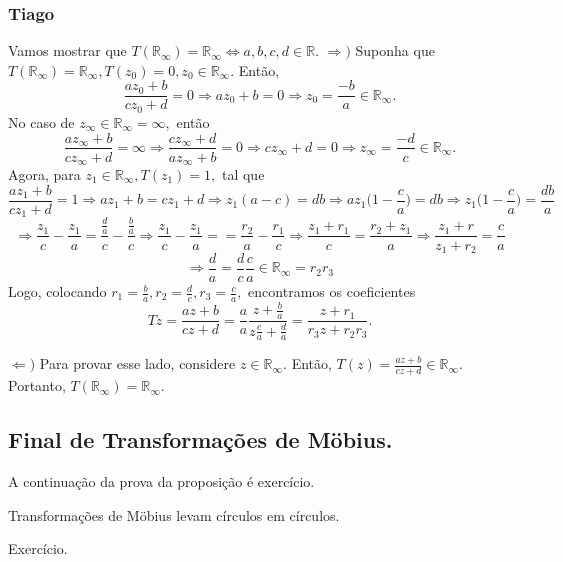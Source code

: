 \documentclass[ComplexAnalysis/complex.tex]{subfiles}
\begin{document}
\subsubsection{Tiago}
Vamos mostrar que $T(\mathbb{R}_\infty) = \mathbb{R}_{\infty}\Longleftrightarrow a, b, c, d\in \mathbb{R}$.
$\Rightarrow)$ Suponha que $T(\mathbb{R}_\infty) = \mathbb{R}_\infty, T(z_{0}) = 0, z_{0}\in \mathbb{R}_\infty.$ Então,
$$
	\frac{az_{0} + b}{cz_{0} + d} = 0\Rightarrow az_{0} + b = 0\Rightarrow z_{0} = \frac{-b}{a}\in \mathbb{R}_\infty.
$$
No caso de $z_\infty \in \mathbb{R}_\infty = \infty, $ então
$$
	\frac{az_{\infty} + b}{cz_{\infty} + d} = \infty\Rightarrow \frac{cz_{\infty} + d}{az_{\infty} + b} = 0\Rightarrow cz_\infty + d = 0
	\Rightarrow z_\infty = \frac{-d}{c}\in \mathbb{R}_\infty.
$$
Agora, para $z_{1}\in \mathbb{R}_{\infty}, T(z_{1}) = 1,$ tal que
$$
	\frac{az_{1} + b}{cz_{1} + d} = 1\Rightarrow az_{1} + b = cz_{1} + d\Rightarrow z_{1}(a - c) = db\Rightarrow az_{1}\biggl(1 - \frac{c}{a}\biggr) = db
	\Rightarrow z_{1}\biggl(1 - \frac{c}{a}\biggr) = \frac{db}{a}
$$
$$
	\Rightarrow \frac{z_{1}}{c} - \frac{z_1}{a} = \frac{\frac{d}{a}}{c} - \frac{\frac{b}{a}}{c}\Rightarrow \frac{z_1}{c} - \frac{z_1}{a} =
	= \frac{r_2}{a} - \frac{r_1}{c}\Rightarrow \frac{z_1 + r_1}{c} = \frac{r_2 + z_1}{a}\Rightarrow \frac{z_1 + r}{z_1 + r_2} = \frac{c}{a}
$$
$$
	\Rightarrow \frac{d}{a} = \frac{d}{c}\frac{c}{a}\in \mathbb{R}_{\infty} = r_2r_3
$$
Logo, colocando $r_{1} = \frac{b}{a}, r_2 = \frac{d}{c}, r_3 = \frac{c}{a},$ encontramos os coeficientes
$$
	Tz = \frac{az + b}{cz + d} = \frac{a}{a}\frac{z + \frac{b}{a}}{z \frac{c}{a} + \frac{d}{a}} = \frac{z + r_1}{r_3z + r_2r_3}.
$$

$\Leftarrow)$ Para provar esse lado, considere $z\in \mathbb{R}_\infty.$ Então, $T(z) = \frac{az + b}{cz + d}\in \mathbb{R}_\infty.$ Portanto,
$T(\mathbb{R}_\infty) = \mathbb{R}_\infty.$  \qedsymbol

\subsection{Final de Transformações de M\"{o}bius.}
A continuação da prova da proposição é exercício.
\begin{theorem*}
	Transformações de M\"{o}bius levam círculos em círculos.
\end{theorem*}
\begin{proof*}
	Exercício.
\end{proof*}
\end{document}

